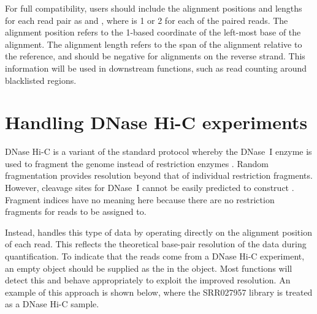 \documentclass{report}\usepackage[]{graphicx}\usepackage[usenames,dvipsnames]{color}
\newcommand{\hlnum}[1]{\textcolor[rgb]{0.816,0.125,0.439}{#1}}%
\newcommand{\hlstr}[1]{\textcolor[rgb]{0.251,0.627,0.251}{#1}}%
\newcommand{\hlopt}[1]{\textcolor[rgb]{0,0,0}{#1}}%
\newcommand{\hlstd}[1]{\textcolor[rgb]{0.251,0.251,0.251}{#1}}%
\newcommand{\hlkwb}[1]{\textcolor[rgb]{0,0,0}{#1}}%
\newcommand{\hlkwc}[1]{\textcolor[rgb]{0.251,0.251,0.251}{#1}}%
\newcommand{\hlkwd}[1]{\textcolor[rgb]{0.878,0.439,0.125}{#1}}%
\newenvironment{knitrout}{}{} %
\begin{document}
\begin{knitrout}
\color{fgcolor}
\end{knitrout}

For full compatibility, users should include the alignment positions and lengths for each read pair as  and ,
    where  is 1 or 2 for each of the paired reads.
The alignment position refers to the 1-based coordinate of the left-most base of the alignment.
The alignment length refers to the span of the alignment relative to the reference, and should be negative for alignments on the reverse strand.
This information will be used in downstream  functions, such as read counting around blacklisted regions.

\section{Handling DNase Hi-C experiments}
DNase Hi-C is a variant of the standard protocol whereby the DNase~I enzyme is used to fragment the genome instead of restriction enzymes \cite{ma2015dnase}.
Random fragmentation provides resolution beyond that of individual restriction fragments.
However, cleavage sites for DNase~I cannot be easily predicted to construct .
Fragment indices have no meaning here because there are no restriction fragments for reads to be assigned to.

Instead,  handles this type of data by operating directly on the alignment position of each read.
This reflects the theoretical base-pair resolution of the data during quantification.
To indicate that the reads come from a DNase Hi-C experiment, an empty  object should be supplied as the  in the  object.
Most  functions will detect this and behave appropriately to exploit the improved resolution.
An example of this approach is shown below, where the SRR027957 library is treated as a DNase Hi-C sample.
\end{document}
